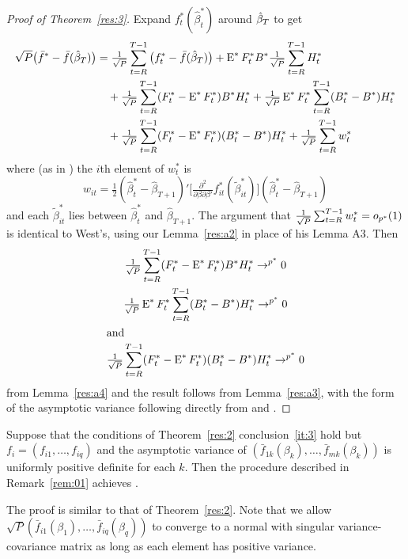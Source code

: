 \documentclass[12pt,fleqn]{article}
\begin{document}
\newcommand{\WesA}[1][]{\oclt{t}
  (F_t^{#1} - \E^{#1} F_t^{#1}) B^{#1} H_t^{#1}}
\newcommand{\WesB}[1][]{\tfrac{1}{\sqrt{P}} \E^{#1} F_t^{#1} \osum{t} (B_t^{#1} -
  B^{#1}) H_t^{#1}}
\newcommand{\WesC}[1][]{\oclt{t}
  (F_t^{#1} - \E^{#1} F_t^{#1}) (B_t^{#1} - B^{#1}) H_t^{#1}}
\begin{proof}[Proof of Theorem~\ref{res:3}]
  Expand $f_t^{*}(\hat{\beta}_t^{*})$ around $\btrue[*]$
  to get
  \begin{align*}
    \sqrt{P} \big(\bar{f}^{*} - \bar{f}(\btrue[*])\big) &= \oclt{t}
    \big(f_t^{*} - \bar{f}(\btrue[*])\big) +
    \E^* F_t^{*} B^{*} \oclt{t} H_t^* \\
    & \quad + \WesA[*] + \WesB[*] \\ & \quad + \WesC[*] + \oclt{t} w_t^*
  \end{align*}
  where (as in \citealp{Wes:96}) the $i$th element of $w_t^*$ is
  \begin{equation*}
    w_{it} = \tfrac12 (\hat\beta_t^* - \hat\beta_{T+1})'
    \Big[\tfrac{\partial^2}{\partial \beta \partial\beta'}
    f_{it}^*(\tilde\beta_{it}^*) \Big]
    (\hat\beta_t^* - \hat\beta_{T+1})
  \end{equation*}
  and each $\tilde\beta_{it}^*$ lies between $\hat\beta_t^*$ and
  $\hat\beta_{T+1}$.  The argument that $\tfrac{1}{\sqrt{P}} \sum_{t=R}^{T-1} w_t^* = o_{p^*}(1)$ is
  identical to West's, using our Lemma~\ref{res:a2} in place of his
  Lemma A3.  Then
  \begin{gather}
    \WesA[*] \to^{p^*} 0 \label{eq:7} \\
    \WesB[*] \to^{p^*} 0 \label{eq:9} \\
  \intertext{and}
    \WesC[*] \to^{p^*} 0 \label{eq:10}
  \end{gather}
  from Lemma~\ref{res:a4} and the result follows from
  Lemma~\ref{res:a3}, with the form of the asymptotic variance
  following directly from \citet{Wes:96} and \citet{WeM:98}.
\end{proof}

\begin{lem}
  Suppose that the conditions of Theorem~\ref{res:2} conclusion~\ref{it:3}
  hold but $f_i = (f_{i1},\dots,f_{iq})$ and the asymptotic variance
  of $(\bar{f}_{1k}(\beta_k),\dots,\bar{f}_{mk}(\beta_k))$ is
  uniformly positive definite for each $k$.  Then the procedure
  described in Remark~\ref{rem:01} achieves \sfwe.
\end{lem}

The proof is similar to that of Theorem~\ref{res:2}. Note that we
allow $\sqrt{P}(\bar{f}_{i1}(\beta_1),\dots,\bar{f}_{iq}(\beta_q))$ to
converge to a normal with singular variance-covariance matrix as long
as each element has positive variance.
\end{document}
